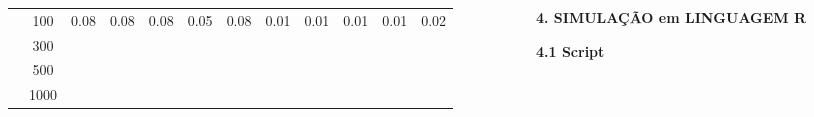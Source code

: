 \documentclass[final]{beamer}
\begin{document}
\begin{frame}[t]
\begin{columns}[t,totalwidth=0.6\paperwidth]
\begin{column}{0.45\paperwidth}
\begin{table}[H]
\begin{tabular}{c|c|c|c|c|c|c|c|c|c|c|c}
               & 100    &  0.08 & 0.08  &  0.08 &  0.05 & 0.08  & 0.01  & 0.01  & 0.01   & 0.01   & 0.02    \\
               & 300    &       &       &       &      &       &        &       &         &         &        \\
               & 500    &       &       &       &      &       &        &       &         &         &        \\
               & 1000   &       &       &       &      &       &        &       &         &         &        \\
    \hline \hline
    \end{tabular}
    \label{tab:inverted2}
\end{table}


\vspace{1em}
 \justifying
 
  \end{column}
  \hspace{0.02\paperwidth} 

  \begin{column}{0.45\textwidth}
 
{\large\bfseries 4. SIMULAÇÃO em LINGUAGEM R}\par
\justifying
\vspace{1.3cm}

{\large\bfseries 4.1 Script}\par
\vspace{1.3cm}


\end{column}
\end{columns}
\end{frame}
\end{document}
